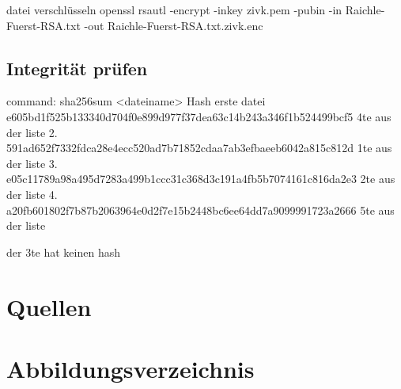\documentclass[a4paper]{article}
\begin{document}
datei verschlüsseln
openssl rsautl -encrypt -inkey zivk.pem -pubin -in Raichle-Fuerst-RSA.txt -out Raichle-Fuerst-RSA.txt.zivk.enc

\subsection{Integrität prüfen}
command:
sha256sum <dateiname>
Hash erste datei
e605bd1f525b133340d704f0e899d977f37dea63c14b243a346f1b524499bcf5
4te aus der liste
2.
591ad652f7332fdca28e4ecc520ad7b71852cdaa7ab3efbaeeb6042a815c812d
1te aus der liste
3.
e05c11789a98a495d7283a499b1ccc31c368d3c191a4fb5b7074161c816da2e3
2te aus der liste
4.
a20fb601802f7b87b2063964e0d2f7e15b2448bc6ee64dd7a9099991723a2666
5te aus der liste

der 3te hat keinen hash



\newpage
\section{Quellen}

\newpage
\section{Abbildungsverzeichnis}

\listoffigures
\end{document}

